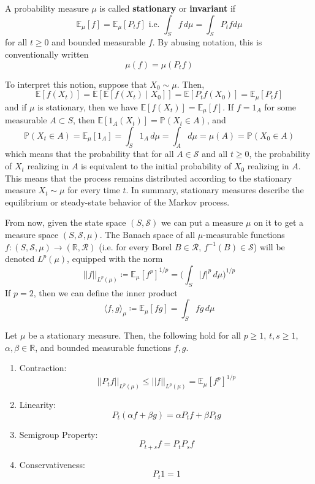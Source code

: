 \documentclass{article}
\begin{document}
  \begin{definition}
  A probability measure $\mu$ is called \textbf{stationary} or \textbf{invariant} if 
  \[\mathbb{E}_\mu[f] = \mathbb{E}_\mu [P_t f] \text{ i.e. } \int_S f \,d \mu = \int_S P_t f d\mu\]
  for all $t \geq 0$ and bounded measurable $f$. By abusing notation, this is conventionally written 
  \[\mu(f) = \mu(P_t f)\]
  \end{definition}

  To interpret this notion, suppose that $X_0 \sim \mu$. Then, 
  \[\mathbb{E}[f(X_t)] = \mathbb{E}[\mathbb{E}[f(X_t) \mid X_0]] = \mathbb{E}[P_t f (X_0)] = \mathbb{E}_\mu [P_t f]\]
  and if $\mu$ is stationary, then we have $\mathbb{E}[f(X_t)] = \mathbb{E}_\mu [f]$. If $f = 1_A$ for some measurable $A \subset S$, then $\mathbb{E}[1_A (X_t)] = \mathbb{P}(X_t \in A)$, and 
  \[\mathbb{P}(X_t \in A) = \mathbb{E}_\mu [1_A] = \int_S 1_A \,d\mu = \int_A d\mu = \mu(A) = \mathbb{P}(X_0 \in A)\]
  which means that the probability that for all $A \in \mathcal{S}$ and all $t \geq 0$, the probability of $X_t$ realizing in $A$ is equivalent to the initial probability of $X_0$ realizing in $A$. This means that the process remains distributed according to the stationary measure $X_t \sim \mu$ for every time $t$. In summary, stationary measures describe the equilibrium or steady-state behavior of the Markov process.  

  From now, given the state space $(S, \mathcal{S})$ we can put a measure $\mu$ on it to get a measure space $(S, \mathcal{S}, \mu)$. The Banach space of all $\mu$-measurable functions $f: (S, \mathcal{S}, \mu) \rightarrow (\mathbb{R}, \mathcal{R})$ (i.e. for every Borel $B \in \mathcal{R}$, $f^{-1}(B) \in \mathcal{S}$) will be denoted $L^p (\mu)$, equipped with the norm 
  \[||f||_{L^p(\mu)} \coloneqq \mathbb{E}_\mu [f^p]^{1/p} = \bigg( \int_S |f|^p \,d\mu \bigg)^{1/p}\]
  If $p = 2$, then we can define the inner product 
  \[\langle f, g \rangle_\mu \coloneqq \mathbb{E}_\mu [f g] = \int_S f g \, d\mu\]

  \begin{lemma}
  Let $\mu$ be a stationary measure. Then, the following hold for all $p \geq 1$, $t, s \geq 1$, $\alpha, \beta \in \mathbb{R}$, and bounded measurable functions $f, g$. 
  \begin{enumerate}
      \item Contraction: 
      \[||P_t f||_{L^p(\mu)} \leq ||f||_{L^p (\mu)} = \mathbb{E}_\mu [f^p]^{1/p}\]
      
      \item Linearity: 
      \[P_t (\alpha f + \beta g) = \alpha P_t f + \beta P_t g\] 
      
      \item Semigroup Property: 
      \[P_{t + s} f = P_t P_s f\]
      
      \item Conservativeness: 
      \[P_t 1 = 1\]
  \end{enumerate}
  \end{lemma}
\end{document}
